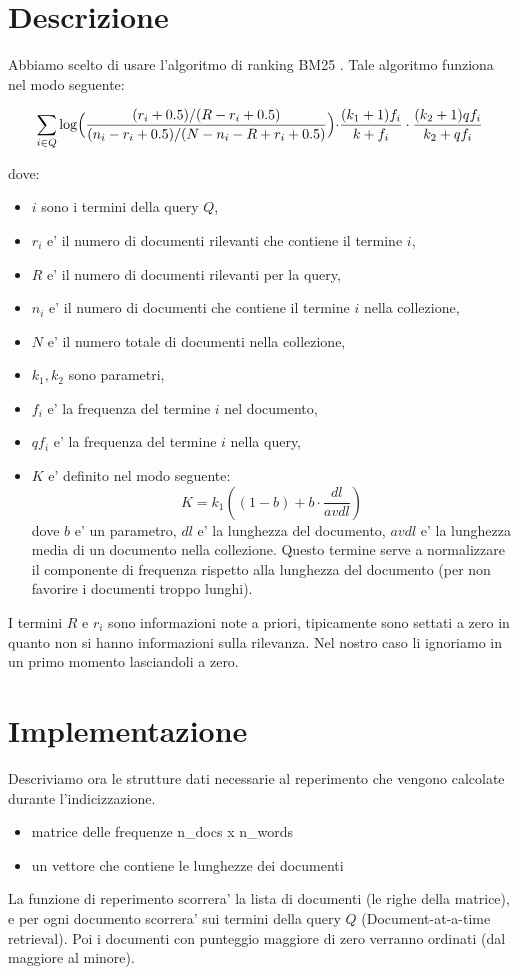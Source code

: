 \documentclass[12pt]{article}
\begin{document}
\maketitle

\section*{Descrizione}

Abbiamo scelto di usare l'algoritmo di ranking BM25 .
Tale algoritmo funziona nel modo seguente:

\[ \sum\limits_{i \in Q}\log\Bigl(\frac{(r_i+0.5)/(R-r_i+0.5)}{(n_i-r_i+0.5)/(N-n_i-R+r_i+0.5)}\Bigl)\cdot\frac{(k_1+1)f_i}{k+f_i}\cdot\frac{(k_2+1)qf_i}{k_2+qf_i} \]

dove:
\begin{itemize}
\item $i$ sono i termini della query $Q$, 
\item $r_i$ e' il numero di documenti rilevanti che contiene il termine $i$,
\item $R$ e' il numero di documenti rilevanti per la query, 
\item $n_i$ e' il numero di documenti che contiene il termine $i$ nella collezione,
\item $N$ e' il numero totale di documenti nella collezione, 
\item $k_1, k_2$ sono parametri,
\item $f_i$ e' la frequenza del termine $i$ nel documento,
\item $qf_i$ e' la frequenza del termine $i$ nella query,
\item $K$ e' definito nel modo seguente:
\[ K = k_1((1-b) +b \cdot \frac{dl}{avdl}) \]
dove $b$ e' un parametro, $dl$ e' la lunghezza del documento, $avdl$ e' la lunghezza media di un documento nella collezione. Questo termine serve a normalizzare il componente di frequenza rispetto alla lunghezza del documento (per non favorire i documenti troppo lunghi).
\end{itemize}
I termini $R$ e $r_i$ sono informazioni note a priori, tipicamente sono settati a zero in quanto non si hanno informazioni sulla rilevanza. Nel nostro caso li ignoriamo in un primo momento lasciandoli a zero.

\section*{Implementazione}
 
Descriviamo ora le strutture dati necessarie al reperimento che vengono calcolate durante l'indicizzazione. 
\begin{itemize}
\item matrice delle frequenze n\_docs x n\_words
\item un vettore che contiene le lunghezze dei documenti
\end{itemize}
La funzione di reperimento scorrera' la lista di documenti (le righe della matrice), e per ogni documento scorrera' sui termini della query $Q$ (Document-at-a-time retrieval). Poi i documenti con punteggio maggiore di zero verranno ordinati (dal maggiore al minore).
\end{document}
